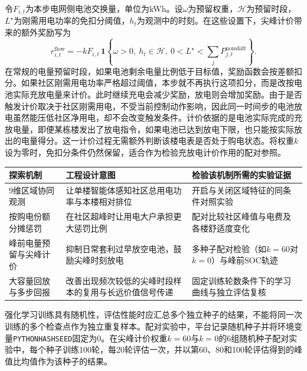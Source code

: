 令$F_{i,t}$为本步电网侧电池交换量，单位为kWh。设$\omega$为预留权重，$\mathcal H$为预留时段，$L^\star$为刚需用电功率的免扣分阈值，$h_t$为观测中的时刻。在这些设置下，尖峰计价带来的额外奖励写为
\begin{equation}
    \label{eq:district-flow-reward}
    r^{\mathrm{flow}}_{i,t}=-kF_{i,t}\,
    \mathbf{1}\!\left\{\omega>0,\ h_t\in\mathcal H,\
    0<L^\star<\sum_jP_{j,t}^{\mathrm{nonshift}}\right\}.
\end{equation}
在常规的电量预留时段，如果电池剩余电量比例低于目标值，奖励函数会按差额扣分。如果社区刚需用电功率严格超过阈值，本步就不再执行这项扣分，而是改按电池实际充放电量来计价。此时继续充电会减少奖励，放电则会增加奖励。由于是否触发计价取决于社区刚需用电，不受当前控制动作影响，因此同一时间步的电池放电虽然能压低社区净用电，却不会改变触发条件。计价依据的是电池实际完成的充放电量，即便某栋楼发出了放电指令，如果电池已达到放电下限，也只能按实际放出的电量得分。这一计价过程无需额外判断该楼电表是否处于购电状态。将权重$k$设为零时，免扣分条件仍然保留，适合作为检验充放电计价作用的配对参照。
\begin{table}[!htbp]
    \centering
    \label{tab:plan-summary}
    \begin{tabular}{P{8em}P{11em}P{10em}}
        \toprule
        探索机制        & 工程设计意图                      & 检验该机制所需的实验证据                   \\ \midrule
        9维区域协同观测    & 让单楼智能体感知社区总用电功率与本楼相对排位      & 开启与关闭区域特征的同条件对照实验              \\
        按购电份额分摊惩罚   & 在社区超峰时让用电大户承担更大惩罚比例         & 配对比较社区峰值与电费及各楼舒适度变化            \\
        峰前电量预留与尖峰计价 & 抑制日常套利过早放空电池，鼓励尖峰时刻放电       & 多种子配对检验（如$k=60$对$k=0$）与峰前SOC轨迹 \\
        大容量回放与多步回报  & 改善出现频次较低的尖峰时段样本的复用与长远价值信号传递 & 固定训练轮数条件下的学习曲线与独立评估复核          \\
        \bottomrule
    \end{tabular}
\end{table}

强化学习训练具有随机性，评估性能时应汇总多个独立种子的结果，不能将同一次训练的多个检查点作为独立重复样本\cite{agarwal2021precipice}。配对实验中，平台记录随机种子并将环境变量\texttt{PYTHONHASHSEED}固定为$0$。在尖峰计价权重$k=60$与$k=0$的6组随机种子配对实验中，每个种子训练100轮，每20轮评估一次，并以第60、80和100轮评估得到的峰值比均值作为该种子的结果。

